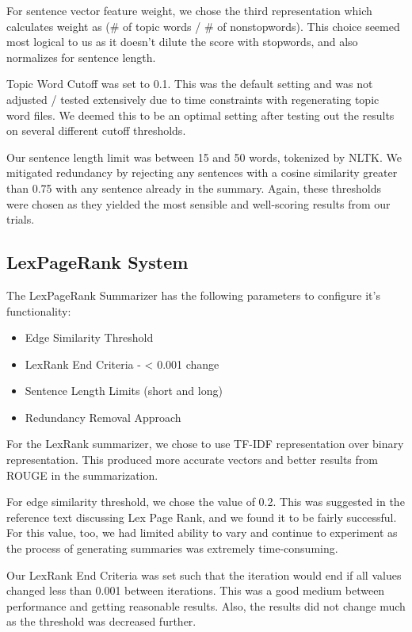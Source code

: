 \documentclass[11pt,letterpaper]{article}
\begin{document}
For sentence vector feature weight, we chose the third representation which calculates weight as (\# of topic words / \# of nonstopwords). This choice seemed most logical to us as it doesn't dilute the score with stopwords, and also normalizes for sentence length.

Topic Word Cutoff was set to 0.1. This was the default setting and was not adjusted / tested extensively due to time constraints with regenerating topic word files. We deemed this to be an optimal setting after testing out the results on several different cutoff thresholds.

Our sentence length limit was between 15 and 50 words, tokenized by NLTK. We mitigated redundancy by rejecting any sentences with a cosine similarity greater than 0.75 with any sentence already in the summary. Again, these thresholds were chosen as they yielded the most sensible and well-scoring results from our trials.

\subsection{LexPageRank System}
The LexPageRank Summarizer has the following parameters to configure it's functionality:
\begin{itemize}
\item Edge Similarity Threshold
\item LexRank End Criteria - < 0.001 change
\item Sentence Length Limits (short and long)
\item Redundancy Removal Approach
\end{itemize}

For the LexRank summarizer, we chose to use TF-IDF representation over binary representation. This produced more accurate vectors and better results from ROUGE in the summarization.

For edge similarity threshold, we chose the value of 0.2. This was suggested in the reference text discussing Lex Page Rank, and we found it to be fairly successful. For this value, too, we had limited ability to vary and continue to experiment as the process of generating summaries was extremely time-consuming.

Our LexRank End Criteria was set such that the iteration would end if all values changed less than 0.001 between iterations. This was a good medium between performance and getting reasonable results. Also, the results did not change much as the threshold was decreased further.
\end{document}
